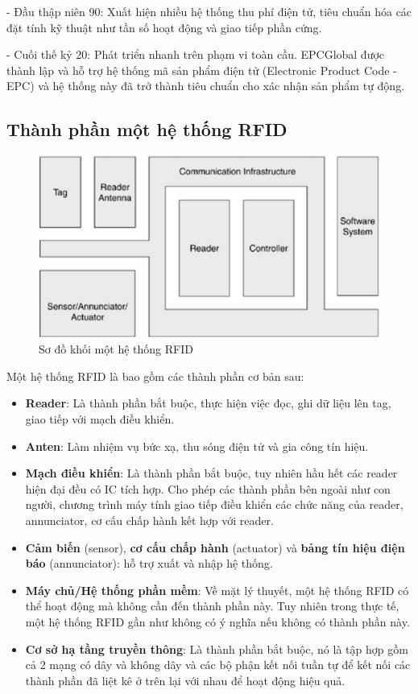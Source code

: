 - Đầu thập niên 90: Xuất hiện nhiều hệ thống thu phí điện tử, tiêu chuẩn hóa các đặt tính kỹ thuật như tần số hoạt động
và giao tiếp phần cứng.

\newpage
- Cuối thế kỷ 20: Phát triển nhanh trên phạm vi toàn cầu.
EPCGlobal được thành lập và hỗ trợ hệ thống mã sản phẩm điện tử (Electronic Product Code - EPC)
và hệ thống này đã trở thành tiêu chuẩn cho xác nhận sản phẩm tự động.

\subsection{Thành phần một hệ thống RFID}
\begin{figure}[ht]
\centering
\includegraphics[scale=0.6]{images/rfid_block_diagram.png}
\caption{Sơ đồ khối một hệ thống RFID}
\end{figure}

Một hệ thống RFID là bao gồm các thành phần cơ bản sau:
\begin{itemize}
    \item \textbf{Reader}: Là thành phần bắt buộc, thực hiện việc đọc, ghi dữ liệu lên tag, giao tiếp với mạch điều khiển.
    \item \textbf{Anten}: Làm nhiệm vụ bức xạ, thu sóng điện tử và gia công tín hiệu.
    \item \textbf{Mạch điều khiển}: Là thành phần bắt buộc, tuy nhiên hầu hết các reader hiện đại đều có IC tích hợp.
        Cho phép các thành phần bên ngoài như con người, chương trình máy tính giao tiếp điều khiển các chức năng của reader, annunciator, cơ cấu chấp hành kết hợp với reader.
    \item \textbf{Cảm biến} (sensor), \textbf{cơ cấu chấp hành} (actuator) và \textbf{bảng tín hiệu điện báo} (annunciator): hỗ trợ xuất và nhập hệ thống.
    \item \textbf{Máy chủ/Hệ thống phần mềm}: Về mặt lý thuyết, một hệ thống RFID có thể hoạt động mà không cần đến thành phần này.
        Tuy nhiên trong thực tế, một hệ thống RFID gần như không có ý nghĩa nếu không có thành phần này.
    \item \textbf{Cơ sở hạ tầng truyền thông}: Là thành phần bắt buộc, nó là tập hợp gồm cả 2 mạng có dây và không dây và các bộ phận kết nối tuần tự để kết nối các thành phần đã liệt kê ở trên lại với nhau để hoạt động hiệu quả.
\end{itemize}

